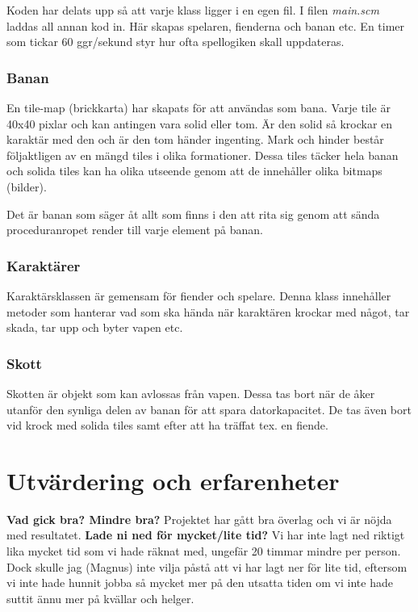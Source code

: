 \documentclass{scrartcl}
\begin{document}
Koden har delats upp så att varje klass ligger i en egen fil. I filen \textsl{main.scm} laddas all annan kod in. Här skapas spelaren, fienderna och banan etc. En timer som tickar 60 ggr/sekund styr hur ofta spellogiken skall uppdateras. 

\subsubsection{Banan}
En tile-map (brickkarta) har skapats för att användas som bana. Varje tile är 40x40 pixlar och kan antingen vara solid eller tom. Är den solid så krockar en karaktär med den och är den tom händer ingenting. Mark och hinder består följaktligen av en mängd tiles i olika formationer. Dessa tiles täcker hela banan och solida tiles kan ha olika utseende genom att de innehåller olika bitmaps (bilder).

Det är banan som säger åt allt som finns i den att rita sig genom att sända proceduranropet render till varje element på banan. 
 

\subsubsection{Karaktärer}

Karaktärsklassen är gemensam för fiender och spelare. Denna klass innehåller metoder som hanterar vad som ska hända när karaktären krockar med något, tar skada, tar upp och byter vapen etc.  

\subsubsection{Skott}

Skotten är objekt som kan avlossas från vapen. Dessa tas bort när de åker utanför den synliga delen av banan för att spara datorkapacitet. De tas även bort vid krock med solida tiles samt efter att ha träffat tex. en fiende. 

\section{Utvärdering och erfarenheter}


\textbf{Vad gick bra? Mindre bra?}
Projektet har gått bra överlag och vi är nöjda med resultatet.  
\textbf{Lade ni ned för mycket/lite tid?}
Vi har inte lagt ned riktigt lika mycket tid som vi hade räknat med, ungefär 20 timmar mindre per person. Dock skulle jag (Magnus) inte vilja påstå att vi har lagt ner för lite tid, eftersom vi inte hade hunnit jobba så mycket mer på den utsatta tiden om vi inte hade suttit ännu mer på kvällar och helger.
\end{document}
